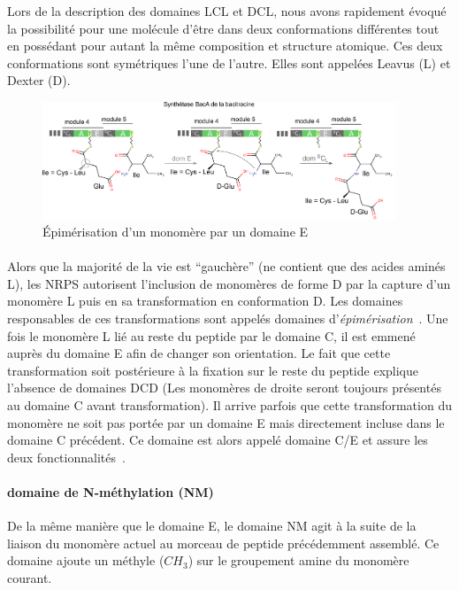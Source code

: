 \documentclass[12pt,french,twoside]{report}
\begin{document}
Lors de la description des domaines LCL et DCL, nous avons rapidement évoqué la possibilité pour une molécule d'être dans deux conformations différentes tout en possédant pour autant la même composition et structure atomique.
Ces deux conformations sont symétriques l'une de l'autre.
Elles sont appelées Leavus (L) et Dexter (D).

\begin{figure}[h!]
  \begin{center}
    \includegraphics[width=400px]{Figures/bio/Intro/domaineE-bacitracine.png}
    \caption{\label{domaine_E}Épimérisation d'un monomère par un domaine E}
  \end{center}
\end{figure}

\paragraph{}Alors que la majorité de la vie est ``gauchère'' (ne contient que des acides aminés L), les NRPS autorisent l'inclusion de monomères de forme D par la capture d'un monomère L puis en sa transformation en conformation D.
Les domaines responsables de ces transformations sont appelés domaines d'\textit{épimérisation}~\cite{calcott_portability_2015}.
Une fois le monomère L lié au reste du peptide par le domaine C, il est emmené auprès du domaine E afin de changer son orientation.
Le fait que cette transformation soit postérieure à la fixation sur le reste du peptide explique l'absence de domaines DCD (Les monomères de droite seront toujours présentés au domaine C avant transformation).
Il arrive parfois que cette transformation du monomère ne soit pas portée par un domaine E mais directement incluse dans le domaine C précédent.
Ce domaine est alors appelé domaine C/E et assure les deux fonctionnalités~\cite{yin_enduracidin_2006,balibar_generation_2005}.


\paragraph{domaine de N-méthylation (NM)}

De la même manière que le domaine E, le domaine NM agit à la suite de la liaison du monomère actuel au morceau de peptide précédemment assemblé.
Ce domaine ajoute un méthyle ($CH_{3}$) sur le groupement amine du monomère courant.
\end{document}
